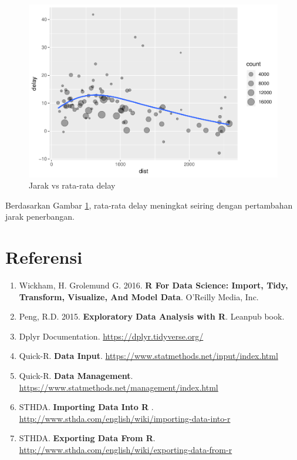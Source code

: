 \documentclass[]{book}
\providecommand{\tightlist}{%
  \setlength{\itemsep}{0pt}\setlength{\parskip}{0pt}}
\begin{document}
\begin{figure}

{\centering \includegraphics[width=0.7\linewidth]{EnvStat_files/figure-latex/distvsave-1} 

}

\caption{Jarak vs rata-rata delay}\label{fig:distvsave}
\end{figure}

Berdasarkan Gambar \ref{fig:distvsave}, rata-rata delay meningkat
seiring dengan pertambahan jarak penerbangan.

\section{Referensi}\label{referensi-2}

\begin{enumerate}
\def\labelenumi{\arabic{enumi}.}
\tightlist
\item
  Wickham, H. Grolemund G. 2016. \textbf{R For Data Science: Import,
  Tidy, Transform, Visualize, And Model Data}. O'Reilly Media, Inc.
\item
  Peng, R.D. 2015. \textbf{Exploratory Data Analysis with R}. Leanpub
  book.
\item
  Dplyr Documentation. \url{https://dplyr.tidyverse.org/}
\item
  Quick-R. \textbf{Data Input}.
  \url{https://www.statmethods.net/input/index.html}
\item
  Quick-R. \textbf{Data Management}.
  \url{https://www.statmethods.net/management/index.html}
\item
  STHDA. \textbf{Importing Data Into R }.
  \url{http://www.sthda.com/english/wiki/importing-data-into-r}
\item
  STHDA. \textbf{Exporting Data From R}.
  \url{http://www.sthda.com/english/wiki/exporting-data-from-r}
\end{enumerate}
\end{document}
